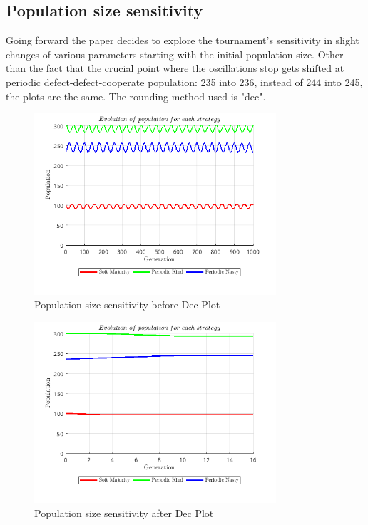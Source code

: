 \documentclass[12pt]{article}
\begin{document}
\subsection{Population size sensitivity}
Going forward the paper decides to explore the tournament's sensitivity in slight changes of various parameters starting with the initial population size. Other than the fact that the crucial point where the oscillations stop gets shifted at periodic defect-defect-cooperate population: 235 into 236, instead of 244 into 245, the plots are the same. The rounding method used is "dec".

\begin{figure}[H]
    \centering
    \includegraphics[width=0.8\textwidth]{media/population_size_sensitivity_before_dec.png}
    \caption{Population size sensitivity before Dec Plot}
\end{figure}

\begin{figure}[H]
    \centering
    \includegraphics[width=0.8\textwidth]{media/population_size_sensitivity_after_dec.png}
    \caption{Population size sensitivity after Dec Plot}
\end{figure}
\end{document}
